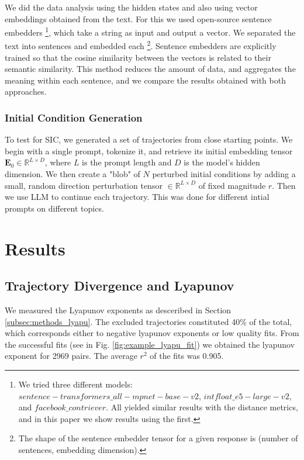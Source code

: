 \documentclass[a4paper,12pt]{article}
\begin{document}
We did the data analysis using the hidden states and also using vector embeddings obtained from the text. For this we used open-source sentence embedders \footnote{We tried three different models: $sentence-transformers\_all-mpnet-base-v2$, $intfloat\_e5-large-v2$, and  $facebook\_contriever$. All yielded similar results with the distance metrics, and in this paper we show results using the first.}, which take a string as input and output a vector. We separated the text into sentences and embedded each \footnote{The shape of the sentence embedder tensor for a given response is (number of sentences, embedding dimension).}. Sentence embedders are explicitly trained so that the cosine similarity between the vectors is related to their semantic similarity. This method reduces the amount of data, and aggregates the meaning within each sentence, and we compare the results obtained with both approaches. 

\subsubsection{Initial Condition Generation}
\label{subsec:init_cond_gen}
To test for SIC, we generated a set of trajectories from close starting points. We begin with a single prompt, tokenize it, and retrieve its initial embedding tensor $\mathbf{E}_0 \in \mathbb{R}^{L \times D}$, where $L$ is the prompt length and $D$ is the model's hidden dimension. We then create a "blob" of $N$ perturbed initial conditions by adding a small, random direction perturbation tensor $\in \mathbb{R}^{L \times D}$ of fixed magnitude $r$. Then we use LLM to continue each trajectory. This was done for different intial prompts on different topics.

\section{Results}
\label{sec:results}

\subsection{Trajectory Divergence and Lyapunov} \label{res:lyapunov}  

We measured the Lyapunov exponents as desceribed in Section \ref{subsec:methods_lyapu}. The excluded trajectories constituted 40\% of the total, which corresponds either to negative lyapunov exponents or low quality fits. From the successful fits (see in Fig. \ref{fig:example_lyapu_fit}) we obtained the lyapunov exponent for 2969 pairs. The average $r^2$ of the fits was 0.905.
\end{document}
